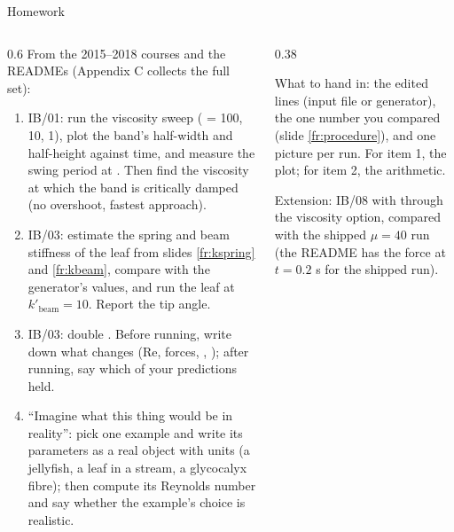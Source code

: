 \documentclass[aspectratio=169,11pt]{beamer}
\begin{document}
\begin{frame}{Homework}
\label{fr:hw}
\begin{columns}[T,onlytextwidth]
\begin{column}{0.6\textwidth}
\footnotesize From the 2015--2018 courses and the READMEs (Appendix C collects the full set):
\begin{enumerate}
  \item IB/01: run the viscosity sweep ( = 100, 10, 1), plot the band's half-width and half-height against time, and measure the swing period at . Then find the viscosity at which the band is critically damped (no overshoot, fastest approach).
  \item IB/03: estimate the spring and beam stiffness of the leaf from slides \ref{fr:kspring} and \ref{fr:kbeam}, compare with the generator's values, and run the leaf at $k'_{\mathrm{beam}} = 10$. Report the tip angle.
  \item IB/03: double . Before running, write down what changes (Re, forces, , ); after running, say which of your predictions held.
  \item ``Imagine what this thing would be in reality'': pick one example and write its parameters as a real object with units (a jellyfish, a leaf in a stream, a glycocalyx fibre); then compute its Reynolds number and say whether the example's choice is realistic.
\end{enumerate}
\end{column}
\begin{column}{0.38\textwidth}
\begin{punchbox}
\footnotesize What to hand in: the edited lines (input file or generator), the one number you compared (slide \ref{fr:procedure}), and one picture per run. For item 1, the plot; for item 2, the arithmetic.
\end{punchbox}
\vspace{1mm}
\footnotesize Extension: IB/08 with  through the viscosity option, compared with the shipped $\mu = 40$ run (the README has the force at $t = 0.2$ s for the shipped run).
\end{column}
\end{columns}
\end{frame}
\end{document}
